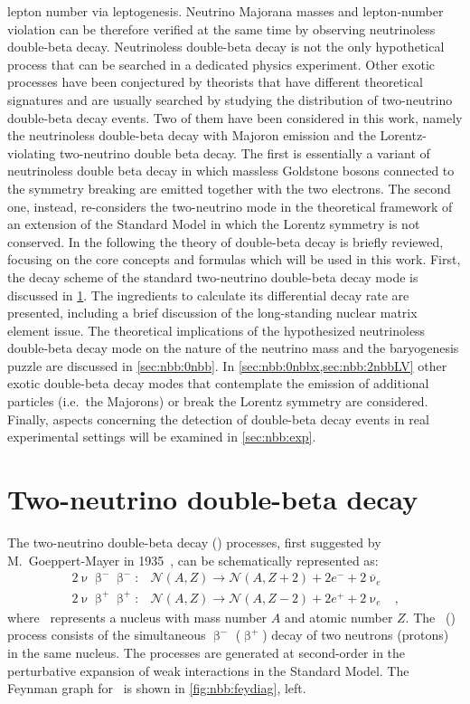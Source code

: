 lepton number via leptogenesis. Neutrino Majorana masses and lepton-number violation can
be therefore verified at the same time by observing neutrinoless double-beta decay.
\newpar
Neutrinoless double-beta decay is not the only hypothetical process that can be searched
in a dedicated physics experiment. Other exotic processes have been conjectured by
theorists that have different theoretical signatures and are usually searched by studying
the distribution of two-neutrino double-beta decay events. Two of them have been
considered in this work, namely the neutrinoless double-beta decay with Majoron emission
and the Lorentz-violating two-neutrino double beta decay. The first is essentially a
variant of neutrinoless double beta decay in which massless Goldstone bosons connected to
the symmetry breaking are emitted together with the two electrons. The second one,
instead, re-considers the two-neutrino mode in the theoretical framework of an extension
of the Standard Model in which the Lorentz symmetry is not conserved.
\newpar
In the following the theory of double-beta decay is briefly reviewed, focusing on the core
concepts and formulas which will be used in this work. First, the decay scheme of the
standard two-neutrino double-beta decay mode is discussed in \cref{sec:nbb:2nbb}. The
ingredients to calculate its differential decay rate are presented, including a brief
discussion of the long-standing nuclear matrix element issue. The theoretical implications
of the hypothesized neutrinoless double-beta decay mode on the nature of the neutrino mass
and the baryogenesis puzzle are discussed in \cref{sec:nbb:0nbb}. In
\cref{sec:nbb:0nbbx,sec:nbb:2nbbLV} other exotic double-beta decay modes that contemplate
the emission of additional particles (i.e.~the Majorons) or break the Lorentz symmetry
are considered. Finally, aspects concerning the detection of double-beta decay events in
real experimental settings will be examined in \cref{sec:nbb:exp}.

\section{Two-neutrino double-beta decay}%
\label{sec:nbb:2nbb}

The two-neutrino double-beta decay (\nnbb) processes, first suggested by M.~Goeppert-Mayer
in 1935~\cite{GoeppertMayer1935}, can be schematically represented as:
\[
  \begin{array}{llr}
    2\upnu\upbeta^-\upbeta^-: &
      \mathcal{N}(A,Z) \longrightarrow \mathcal{N}(A,Z+2)+2e^-+2{\overline \upnu}_e & \\
    2\upnu\upbeta^+\upbeta^+: &
      \mathcal{N}(A,Z) \longrightarrow \mathcal{N}(A,Z-2)+2e^++2\upnu_e &,
  \end{array}
\]
where \NAZ\ represents a nucleus with mass number $A$ and atomic number $Z$. The \nnbbm\
(\nnbbp) process consists of the simultaneous $\upbeta^-$ ($\upbeta^+$) decay of two
neutrons (protons) in the same nucleus. The processes are generated at second-order in the
perturbative expansion of weak interactions in the Standard Model. The Feynman graph for
\nnbbm\ is shown in \cref{fig:nbb:feydiag}, left.

